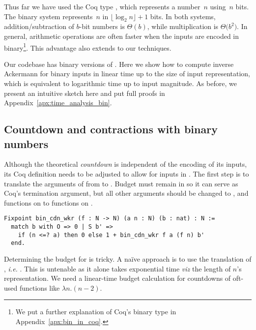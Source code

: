 Thus far we have used the Coq type , which represents
a number~$n$ using~$n$ bits.
The binary system represents~$n$ in $\lfloor \log_{2} n \rfloor + 1$ bits.
In both systems, addition/subtraction of $b$-bit
numbers is $\Theta(b)$, while multiplication is $\Theta \big(b^2\big)$.
In general, arithmetic operations are often faster when the inputs
are encoded in binary\footnote{We put a further explanation of
Coq's binary type  in Appendix~\ref{apx:bin_in_coq}.}. 
This advantage also extends to our techniques.

Our codebase has binary versions of .
Here we show how to compute inverse Ackermann for binary inputs in
linear time up to the size of input representation,
which is equivalent to logarithmic time up to input magnitude.
As before, we present an intuitive sketch here and put
full proofs in Appendix~\ref{apx:time_analysis_bin}.

\subsection{Countdown and contractions with binary numbers}

\renewcommand{\Tleb}{\runtime_{\li{N.leb}}}
\renewcommand{\Tsucc}{\runtime_{\li{N.succ}}}

Although the theoretical \emph{countdown} is independent of the encoding
of its inputs, its Coq definition needs to be adjusted to allow for inputs
in . The first step is to translate the arguments of
 from  to . Budget  must
remain in  so it can serve as Coq's termination argument,
but all other  arguments should be changed
to , and functions on  to functions on .
\begin{lstlisting}
Fixpoint bin_cdn_wkr (f : N -> N) (a n : N) (b : nat) : N :=
  match b with O => 0 | S b' =>
    if (n <=? a) then 0 else 1 + bin_cdn_wkr f a (f n) b'
  end.
\end{lstlisting}

Determining the budget for  is tricky.
A naïve approach is to use the  translation of ,
\emph{i.e.} . This is untenable as it alone
takes exponential time \emph{viz} the length of $n$'s representation.
We need a linear-time budget calculation for countdowns
of oft-used functions like $\lambda n.(n-2)$.

